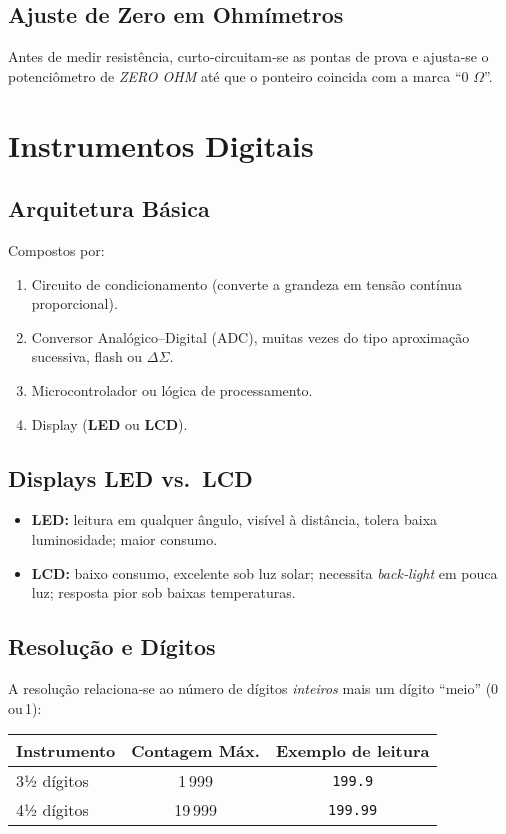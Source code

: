 \subsection{Ajuste de Zero em Ohmímetros}
Antes de medir resistência, curto‑circuitam‑se as pontas de prova e ajusta‑se o potenciômetro de \emph{ZERO OHM} até que o ponteiro coincida com a marca ``0 $\Omega$''.

\section{Instrumentos Digitais}

\subsection{Arquitetura Básica}
Compostos por:
\begin{enumerate}
  \item Circuito de condicionamento (converte a grandeza em tensão contínua proporcional).
  \item Conversor Analógico–Digital (ADC), muitas vezes do tipo aproximação sucessiva, flash ou $\Delta\Sigma$.
  \item Microcontrolador ou lógica de processamento.
  \item Display (\textbf{LED} ou \textbf{LCD}).
\end{enumerate}

\subsection{Displays LED vs.\ LCD}
\begin{itemize}
  \item \textbf{LED:} leitura em qualquer ângulo, visível à distância, tolera baixa luminosidade; maior consumo.
  \item \textbf{LCD:} baixo consumo, excelente sob luz solar; necessita \emph{back‑light} em pouca luz; resposta pior sob baixas temperaturas.
\end{itemize}

\subsection{Resolução e Dígitos}
A resolução relaciona‑se ao número de dígitos \emph{inteiros} mais um dígito ``meio'' (0 ou 1):
\begin{center}
\begin{tabular}{lcc}
\toprule
\textbf{Instrumento} & \textbf{Contagem Máx.} & \textbf{Exemplo de leitura} \\
\midrule
3½ dígitos & 1\,999 & \verb|199.9| \\
4½ dígitos & 19\,999 & \verb|199.99| \\
\bottomrule
\end{tabular}
\end{center}

